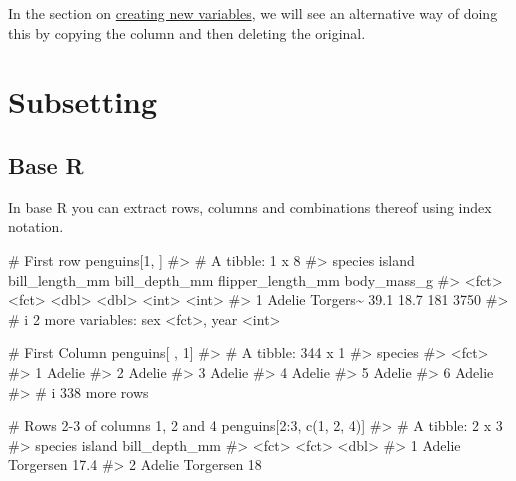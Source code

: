 \documentclass[
  letterpaper,
  DIV=11,
  numbers=noendperiod]{scrreprt}
\newenvironment{Shaded}{\begin{snugshade}}{\end{snugshade}}
\newcommand{\CommentTok}[1]{\textcolor[rgb]{0.37,0.37,0.37}{#1}}
\newcommand{\DecValTok}[1]{\textcolor[rgb]{0.68,0.00,0.00}{#1}}
\newcommand{\FunctionTok}[1]{\textcolor[rgb]{0.28,0.35,0.67}{#1}}
\newcommand{\NormalTok}[1]{\textcolor[rgb]{0.00,0.23,0.31}{#1}}
\newcommand{\SpecialCharTok}[1]{\textcolor[rgb]{0.37,0.37,0.37}{#1}}
\begin{document}
In the section on \hyperref[creating-new-variables]{creating new
variables}, we will see an alternative way of doing this by copying the
column and then deleting the original.

\section{Subsetting}\label{subsetting-1}

\subsection{Base R}\label{base-r-1}

In base R you can extract rows, columns and combinations thereof using
index notation.

\begin{Shaded}
\begin{Highlighting}[]
\CommentTok{\# First row}
\NormalTok{penguins[}\DecValTok{1}\NormalTok{, ]}
\CommentTok{\#\textgreater{} \# A tibble: 1 x 8}
\CommentTok{\#\textgreater{}   species island   bill\_length\_mm bill\_depth\_mm flipper\_length\_mm body\_mass\_g}
\CommentTok{\#\textgreater{}   \textless{}fct\textgreater{}   \textless{}fct\textgreater{}             \textless{}dbl\textgreater{}         \textless{}dbl\textgreater{}             \textless{}int\textgreater{}       \textless{}int\textgreater{}}
\CommentTok{\#\textgreater{} 1 Adelie  Torgers\textasciitilde{}           39.1          18.7               181        3750}
\CommentTok{\#\textgreater{} \# i 2 more variables: sex \textless{}fct\textgreater{}, year \textless{}int\textgreater{}}

\CommentTok{\# First Column }
\NormalTok{penguins[ , }\DecValTok{1}\NormalTok{]}
\CommentTok{\#\textgreater{} \# A tibble: 344 x 1}
\CommentTok{\#\textgreater{}   species}
\CommentTok{\#\textgreater{}   \textless{}fct\textgreater{}  }
\CommentTok{\#\textgreater{} 1 Adelie }
\CommentTok{\#\textgreater{} 2 Adelie }
\CommentTok{\#\textgreater{} 3 Adelie }
\CommentTok{\#\textgreater{} 4 Adelie }
\CommentTok{\#\textgreater{} 5 Adelie }
\CommentTok{\#\textgreater{} 6 Adelie }
\CommentTok{\#\textgreater{} \# i 338 more rows}

\CommentTok{\# Rows 2{-}3 of columns 1, 2 and 4}
\NormalTok{penguins[}\DecValTok{2}\SpecialCharTok{:}\DecValTok{3}\NormalTok{, }\FunctionTok{c}\NormalTok{(}\DecValTok{1}\NormalTok{, }\DecValTok{2}\NormalTok{, }\DecValTok{4}\NormalTok{)]}
\CommentTok{\#\textgreater{} \# A tibble: 2 x 3}
\CommentTok{\#\textgreater{}   species island    bill\_depth\_mm}
\CommentTok{\#\textgreater{}   \textless{}fct\textgreater{}   \textless{}fct\textgreater{}             \textless{}dbl\textgreater{}}
\CommentTok{\#\textgreater{} 1 Adelie  Torgersen          17.4}
\CommentTok{\#\textgreater{} 2 Adelie  Torgersen          18}
\end{Highlighting}
\end{Shaded}
\end{document}
